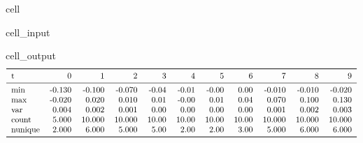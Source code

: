 \documentclass[letterpaper,table,10pt,english]{jupyterBook}
\begin{document}
\begin{sphinxuseclass}{cell}\begin{sphinxVerbatimInput}

\begin{sphinxuseclass}{cell_input}
\begin{sphinxVerbatim}[commandchars=\\\{\}]
 \PYGZbs{}
        \PYG{p}{[}\PYG{p}{]}
\end{sphinxVerbatim}

\end{sphinxuseclass}\end{sphinxVerbatimInput}
\begin{sphinxVerbatimOutput}

\begin{sphinxuseclass}{cell_output}\begin{equation*}
\begin{split}\begin{tabular}{lrrrrrrrrrr}
\toprule
t &      0 &       1 &       2 &      3 &      4 &      5 &      6 &       7 &       8 &       9 \\
\midrule
min     & -0.130 &  -0.100 &  -0.070 &  -0.04 &  -0.01 &  -0.00 &   0.00 &  -0.010 &  -0.010 &  -0.020 \\
max     & -0.020 &   0.020 &   0.010 &   0.01 &  -0.00 &   0.01 &   0.04 &   0.070 &   0.100 &   0.130 \\
var     &  0.004 &   0.002 &   0.001 &   0.00 &   0.00 &   0.00 &   0.00 &   0.001 &   0.002 &   0.003 \\
count   &  5.000 &  10.000 &  10.000 &  10.00 &  10.00 &  10.00 &  10.00 &  10.000 &  10.000 &  10.000 \\
nunique &  2.000 &   6.000 &   5.000 &   5.00 &   2.00 &   2.00 &   3.00 &   5.000 &   6.000 &   6.000 \\
\bottomrule
\end{tabular}\end{split}
\end{equation*}
\end{sphinxuseclass}\end{sphinxVerbatimOutput}

\end{sphinxuseclass}
\end{document}

